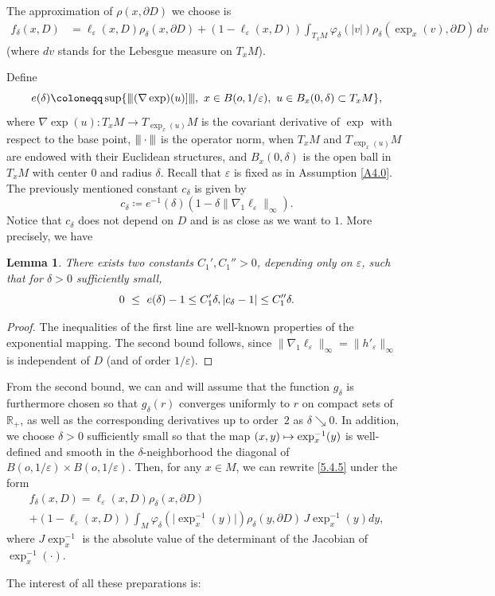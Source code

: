 \documentclass[10pt]{amsart}
\newcommand{\vvvert}{|\mkern-2mu|\mkern-2mu|}
\newcommand\mto{\mathchoice{\longmapsto}{\mapsto}{\mapsto}{\mapsto}}
\theoremstyle{plain}
\newtheorem{lemma}[thm]{Lemma}
\theoremstyle{definition}
\newcommand{\RR}{{\mathbb R}}
\newcommand\df{\coloneqq}
\newcommand{\bq}{\begin{equation*}}
\newcommand{\bqn}[1]{\begin{equation}\label{#1}}
\newcommand{\eq}{\end{equation*}}
\newcommand{\eqn}{\end{equation}}
\let\d\delta
\let\e\varepsilon
\let\n\nabla
\begin{document}
The approximation of $\rho(x,\partial D)$ we choose is
\begin{equation}
\label{5.4.5}
\begin{split}
f_\d(x,D)&=\ell_\e(x,D)\rho_\d(x,\partial D)+(1-\ell_\e(x,D))\int_{T_xM}\varphi_\d(\vert v\vert)\rho_\d(\exp_x(v),\partial D)\, dv
\end{split}
\end{equation}
(where $dv$ stands for the Lebesgue measure on $T_xM$).
\par
Define
\bq
e(\d)\df \sup\{\vvvert (\nabla\exp)(u)]\vvvert,\ x\in B(o,1/\e),\ u\in B_x(0,\d)\subset T_xM\},
\eq
where $\nabla\exp(u): T_xM\to T_{\exp_x(u)}M$ is the covariant derivative of $\exp$ with respect to the base point, $\vvvert\cdot\vvvert$ is the operator norm, when $T_{x}M$ and $T_{\exp_x(u)}M$ are endowed with their Euclidean structures, and $B_x(0,\d)$ is the open ball in $T_xM$ with center $0$ and radius $\delta$. Recall that $\e$ is fixed as in Assumption \ref{A4.0}.
The previously mentioned constant $c_\delta$ is given by
\bqn{cdelta}
c_\delta\df e^{-1}(\d)(1-\d \|\n_1\ell_\e\|_\infty).
\eqn
Notice that $c_\d$ does not depend on $D$ and is as close as we want to $1$.
More precisely, we have
\begin{lemma}
There exists two constants $C_1',C_1''>0$, depending only on $\e$, such that for $\delta>0$ sufficiently small,
\bq
0\ \le\ e(\d)- 1\le C_1'\d,\\
\vert c_\d-1\vert\leq C_1''\d.
\eq
\end{lemma}
\begin{proof}
The inequalities of the first line are well-known properties of the exponential mapping.
The second bound follows, since $\|\n_1\ell_\e\|_\infty=\|h'_\e\|_\infty$ is independent of $D$ (and of order $1/\e$).
\end{proof}
From the second bound, we can and will assume that the function $g_\d$ is furthermore chosen so that $g_\d(r)$ converges uniformly to $r$ on compact sets of $\RR_+$, as well as the corresponding derivatives up to order~$2$ as $\d\searrow 0$.
In addition, we choose $\d>0$ sufficiently small so that the map $(x,y)\mto \exp_x^{-1}(y)$ is well-defined and smooth in the $\d$-neighborhood the diagonal of $B(o,1/\e)\times B(o,1/\e)$.
Then, for any $x\in M$, we can rewrite \eqref{5.4.5} under the form
\begin{multline}
f_\d(x,D)
= \ell_\e(x,D)\rho_\d(x,\partial D)\\
+(1-\ell_\e(x,D))\int_{M}\varphi_\d(\vert \exp_x^{-1}(y)\vert )\rho_\d(y,\partial D)\, J\exp_x^{-1}(y) dy,
\end{multline}
where $J\exp_x^{-1}$ is the absolute value of the determinant of the Jacobian of $\exp_x^{-1}(\cdot)$.
\par
The interest of all these preparations is:
\end{document}
